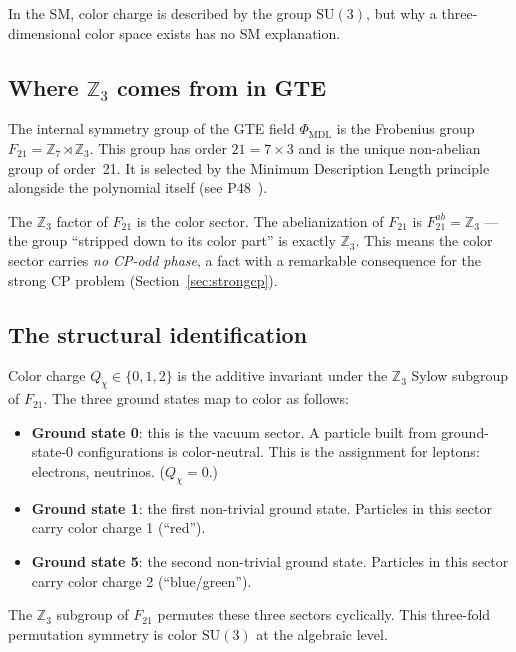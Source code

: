 \documentclass[11pt,a4paper]{article}
\newcommand{\ZS}{\mathbb{Z}_7}
\newcommand{\PHIMDL}{\Phi_{\mathrm{MDL}}}
\begin{document}
In the SM, color charge is described by the group $\mathrm{SU}(3)$, but
why a three-dimensional color space exists has no SM explanation.

\subsection{Where $\mathbb{Z}_3$ comes from in GTE}

The internal symmetry group of the GTE field $\PHIMDL$ is the Frobenius
group $F_{21} = \ZS \rtimes \mathbb{Z}_3$.  This group has order
$21 = 7 \times 3$ and is the unique non-abelian group of order~21.  It is
selected by the Minimum Description Length principle alongside the
polynomial itself (see P48~\cite{SpivackGTECompleteFramework}).

The $\mathbb{Z}_3$ factor of $F_{21}$ is the color sector.  The
abelianization of $F_{21}$ is $F_{21}^{ab} = \mathbb{Z}_3$ --- the group
``stripped down to its color part'' is exactly $\mathbb{Z}_3$.  This means
the color sector carries \emph{no CP-odd phase}, a fact with a remarkable
consequence for the strong CP problem (Section~\ref{sec:strongcp}).

\subsection{The structural identification}

Color charge $Q_\chi \in \{0,1,2\}$ is the additive invariant under the
$\mathbb{Z}_3$ Sylow subgroup of $F_{21}$.  The three ground states map to
color as follows:

\begin{itemize}
  \item \textbf{Ground state 0}: this is the vacuum sector.  A particle
    built from ground-state-0 configurations is color-neutral.  This is
    the assignment for leptons: electrons, neutrinos.  ($Q_\chi = 0$.)
  \item \textbf{Ground state 1}: the first non-trivial ground state.
    Particles in this sector carry color charge 1 (``red'').
  \item \textbf{Ground state 5}: the second non-trivial ground state.
    Particles in this sector carry color charge 2 (``blue/green'').
\end{itemize}

The $\mathbb{Z}_3$ subgroup of $F_{21}$ permutes these three sectors
cyclically.  This three-fold permutation symmetry is color $\mathrm{SU}(3)$
at the algebraic level.
\end{document}
